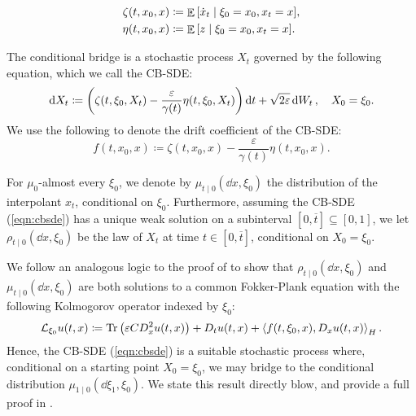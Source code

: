 \begin{align}
  \zeta(t, x_{0}, x) &\coloneqq \mathop{\mathbb{E}}\qty[\dot{x}_{t} \mid \xi_{0} = x_{0}, x_{t} = x],\label{eqn:condzetadef} \\
  \eta(t, x_{0}, x) &\coloneqq \mathop{\mathbb{E}}\qty[ z \mid \xi_{0} = x_{0}, x_{t} = x]. \label{eqn:condetadef}
\end{align}

The conditional bridge is a stochastic process \(X_{t}\) governed by the following equation, which we call the CB-SDE:
\begin{equation}
  \dd{X_{t}} \coloneqq \qty( \zeta(t, \xi_{0}, X_{t}) - \frac{\varepsilon}{\gamma(t)} \eta(t, \xi_{0}, X_{t})) \dd{t} + \sqrt{2\varepsilon} \dd{W_{t}}, \quad X_{0} = \xi_{0}. \label{eqn:cbsde}
\end{equation}
We use the following to denote the drift coefficient of the CB-SDE:
\[
  f(t, x_{0}, x) \coloneqq \zeta(t, x_{0}, x) - \frac{\varepsilon}{\gamma(t)} \eta(t, x_{0}, x).
\]

For \(\mu_{0}\)-almost every \(\xi_{0}\), we denote by \(\mu_{t \mid 0}( \dd{x}, \xi_{0})\) the distribution of the interpolant \(x_{t}\), conditional on \(\xi_{0}\). Furthermore, assuming the CB-SDE (\ref{eqn:cbsde}) has a unique weak solution on a subinterval \([0, \overline{t}] \subseteq [0, 1]\), we let \(\rho_{t \mid 0}(\dd{x}, \xi_{0})\) be the law of \(X_{t}\) at time \(t \in [0, \overline{t}]\), conditional on \(X_{0} = \xi_{0}\).

We follow an analogous logic to the proof of  to show that \(\rho_{t \mid 0}(\dd{x}, \xi_{0})\) and \(\mu_{t \mid 0}(\dd{x}, \xi_{0})\) are both solutions to a common Fokker-Plank equation with the following Kolmogorov operator indexed by \(\xi_{0}\):
\[
  \mathcal{L}_{\xi_{0}} u(t, x) \coloneqq \operatorname{Tr}\qty(\varepsilon C D^{2}_{x} u(t, x)) + D_{t}u(t, x) + \ev{f(t, \xi_{0}, x), D_{x} u(t, x)}_{H}.
\] Hence, the CB-SDE (\ref{eqn:cbsde}) is a suitable stochastic process where, conditional on a starting point \(X_{0} = \xi_{0}\), we may bridge to the conditional distribution \(\mu_{1 \mid 0}(\dd{\xi_{1}}, \xi_{0})\). We state this result directly blow, and provide a full proof in .

